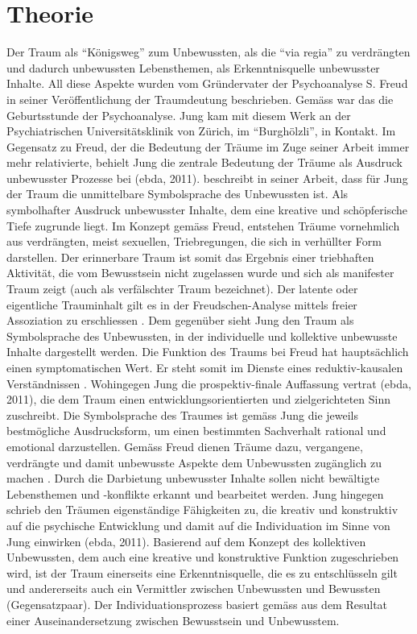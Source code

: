 \section*{Theorie}\label{section.theorie}
Der Traum als “Königsweg” zum Unbewussten, als die “via regia” zu verdrängten und dadurch unbewussten Lebensthemen, als Erkenntnisquelle unbewusster Inhalte. All diese Aspekte wurden vom Gründervater der Psychoanalyse S. Freud in seiner Veröffentlichung der Traumdeutung \cite{Freud:1900} beschrieben. Gemäss  war das die Geburtsstunde der Psychoanalyse. Jung kam mit diesem Werk an der Psychiatrischen Universitätsklinik von Zürich, im “Burghölzli”, in Kontakt. Im Gegensatz zu Freud, der die Bedeutung der Träume im Zuge seiner Arbeit immer mehr relativierte, behielt Jung die zentrale Bedeutung der Träume als Ausdruck unbewusster Prozesse bei (ebda, 2011). \newline
{} beschreibt in seiner Arbeit, dass für Jung der Traum die unmittelbare Symbolsprache des Unbewussten ist. Als symbolhafter Ausdruck unbewusster Inhalte, dem eine kreative und schöpferische Tiefe zugrunde liegt. Im Konzept gemäss Freud, entstehen Träume vornehmlich aus verdrängten, meist sexuellen, Triebregungen, die sich in verhüllter Form darstellen. Der erinnerbare Traum ist somit das Ergebnis einer triebhaften Aktivität, die vom Bewusstsein nicht zugelassen wurde und sich als manifester Traum zeigt (auch als verfälschter Traum bezeichnet). Der latente oder eigentliche Trauminhalt gilt es in der Freudschen-Analyse mittels freier Assoziation zu erschliessen \cite{Stuessi:2013}. Dem gegenüber sieht Jung den Traum als Symbolsprache des Unbewussten, in der individuelle und kollektive unbewusste Inhalte dargestellt werden. Die Funktion des Traums bei Freud hat hauptsächlich einen symptomatischen Wert. Er steht somit im Dienste eines reduktiv-kausalen Verständnissen \cite{Roth:2011}. Wohingegen Jung die prospektiv-finale Auffassung vertrat (ebda, 2011), die dem Traum einen entwicklungsorientierten und zielgerichteten Sinn zuschreibt. Die Symbolsprache des Traumes ist gemäss Jung die jeweils bestmögliche Ausdrucksform, um einen bestimmten Sachverhalt rational und emotional darzustellen. \newline
Gemäss Freud dienen Träume dazu, vergangene, verdrängte und damit unbewusste Aspekte dem Unbewussten zugänglich zu machen \cite{Roth:2011}. Durch die Darbietung unbewusster Inhalte sollen nicht bewältigte Lebensthemen und -konflikte erkannt und bearbeitet werden. Jung hingegen schrieb den Träumen eigenständige Fähigkeiten zu, die kreativ und konstruktiv auf die psychische Entwicklung und damit auf die Individuation im Sinne von Jung einwirken (ebda, 2011). Basierend auf dem Konzept des kollektiven Unbewussten, dem auch eine kreative und konstruktive Funktion zugeschrieben wird, ist der Traum einerseits eine Erkenntnisquelle, die es zu entschlüsseln gilt und andererseits auch ein Vermittler zwischen Unbewussten und Bewussten (Gegensatzpaar). Der Individuationsprozess basiert gemäss  aus dem Resultat einer Auseinandersetzung zwischen Bewusstsein und Unbewusstem.\newline
